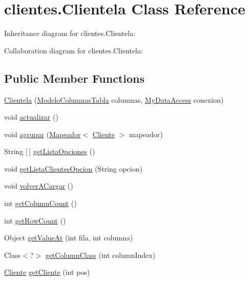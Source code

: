 \hypertarget{classclientes_1_1_clientela}{}\section{clientes.\+Clientela Class Reference}
\label{classclientes_1_1_clientela}


Inheritance diagram for clientes.\+Clientela\+:


Collaboration diagram for clientes.\+Clientela\+:
\subsection*{Public Member Functions}
\begin{DoxyCompactItemize}
\item 
\mbox{\hyperlink{classclientes_1_1_clientela_af168d8a11882d39c22e0e18bd9689deb}{Clientela}} (\mbox{\hyperlink{classclientes_1_1_modelo_columnas_tabla}{Modelo\+Columnas\+Tabla}} columnas, \mbox{\hyperlink{classconexion_s_q_l_1_1_my_data_access}{My\+Data\+Access}} conexion)
\item 
void \mbox{\hyperlink{classclientes_1_1_clientela_acea670c44be086472e0ccd9c3f2c1f67}{actualizar}} ()
\item 
void \mbox{\hyperlink{classclientes_1_1_clientela_ae120fcd5a51e1d17d11e3b36ca1d8290}{agrupar}} (\mbox{\hyperlink{interfaceclientes_1_1_mapeador}{Mapeador}}$<$ \mbox{\hyperlink{classclientes_1_1_cliente}{Cliente}} $>$ mapeador)
\item 
String \mbox{[}$\,$\mbox{]} \mbox{\hyperlink{classclientes_1_1_clientela_a036492cd5e2bba079ef0874b9693d9e1}{get\+Lista\+Opciones}} ()
\item 
void \mbox{\hyperlink{classclientes_1_1_clientela_a8275e9ef86c96a9070cff779e5a0169e}{get\+Lista\+Clientes\+Opcion}} (String opcion)
\item 
void \mbox{\hyperlink{classclientes_1_1_clientela_a99c3c767c734c205696aaf32131e0119}{volver\+A\+Cargar}} ()
\item 
int \mbox{\hyperlink{classclientes_1_1_clientela_a43ca9c21c992f1bd25544b5cc6d1ed0e}{get\+Column\+Count}} ()
\item 
int \mbox{\hyperlink{classclientes_1_1_clientela_a2637748da710e9aa18044fd614d3e1cc}{get\+Row\+Count}} ()
\item 
Object \mbox{\hyperlink{classclientes_1_1_clientela_a58c7e701ceb7a1eb87d4aa996fc1e546}{get\+Value\+At}} (int fila, int columna)
\item 
Class$<$?$>$ \mbox{\hyperlink{classclientes_1_1_clientela_af7d9f77f6b5b1582fcdb4df4b92551fd}{get\+Column\+Class}} (int column\+Index)
\item 
\mbox{\hyperlink{classclientes_1_1_cliente}{Cliente}} \mbox{\hyperlink{classclientes_1_1_clientela_a1d531f14dc541569b84f1f72c760d376}{get\+Cliente}} (int pos)
\end{DoxyCompactItemize}
